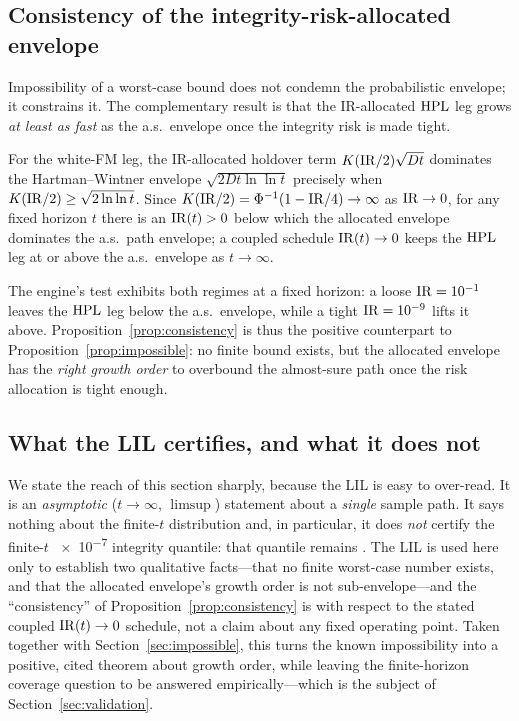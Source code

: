 \subsection{Consistency of the integrity-risk-allocated envelope}
\label{sec:consistency}

Impossibility of a worst-case bound does not condemn the probabilistic envelope; it
constrains it. The complementary result is that the IR-allocated $\mathrm{HPL}$ leg grows
\emph{at least as fast} as the a.s.\ envelope once the integrity risk is made
tight.

\begin{proposition}[Consistency as $\IR\to0$]
\label{prop:consistency}
For the white-FM leg, the IR-allocated holdover term
$K(\mathrm{IR}/2)\sqrt{Dt}$ dominates the Hartman--Wintner envelope
$\sqrt{2Dt\ln\ln t}$ precisely when
$K(\mathrm{IR}/2)\ge\sqrt{2\ln\ln t}$. Since $K(\mathrm{IR}/2)=\Phi^{-1}(1-\mathrm{IR}/4)\to\infty$ as
$\IR\to0$, for any fixed horizon $t$ there is an $\mathrm{IR}(t)>0$ below which the
allocated envelope dominates the a.s.\ path envelope; a coupled schedule
$\mathrm{IR}(t)\to0$ keeps the $\mathrm{HPL}$ leg at or above the a.s.\ envelope as $t\to\infty$.
\end{proposition}

The engine's test 
exhibits both regimes at a fixed horizon: a loose $\mathrm{IR}=10^{-1}$ leaves the $\mathrm{HPL}$
leg below the a.s.\ envelope, while a tight $\mathrm{IR}=\num{e-9}$ lifts it above.
Proposition~\ref{prop:consistency} is thus the positive counterpart to
Proposition~\ref{prop:impossible}: no finite bound exists, but the allocated
envelope has the \emph{right growth order} to overbound the almost-sure path once
the risk allocation is tight enough.

\subsection{What the LIL certifies, and what it does not}
\label{sec:lilscope}

We state the reach of this section sharply, because the LIL is easy to over-read.
It is an \emph{asymptotic} ($t\to\infty$, $\limsup$) statement about a
\emph{single} sample path. It says nothing about the finite-$t$ distribution and,
in particular, it does \emph{not} certify the finite-$t$ \num{e-7} integrity
quantile: that quantile remains \Modelled{}. The LIL is used here only to
establish two qualitative facts---that no finite worst-case number exists, and
that the allocated envelope's growth order is not sub-envelope---and the
``consistency'' of Proposition~\ref{prop:consistency} is with respect to the
stated coupled $\mathrm{IR}(t)\to0$ schedule, not a claim about any fixed operating point.
Taken together with Section~\ref{sec:impossible}, this turns the known
impossibility into a positive, cited theorem about growth order, while leaving the
finite-horizon coverage question to be answered empirically---which is the subject
of Section~\ref{sec:validation}.

